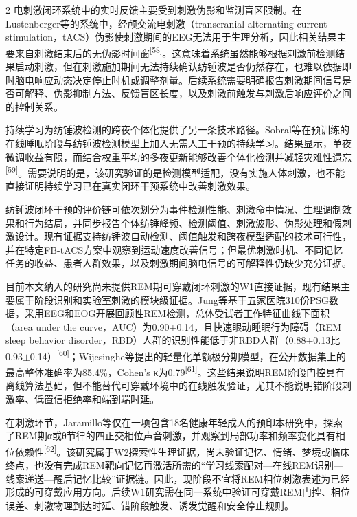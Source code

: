\documentclass[UTF8,zihao=5,fontset=none]{ctexart}
\newcommand{\hei}{\CJKfamily{hei}}
\newcommand{\leveltwo}[1]{%
  \par\noindent{\hei\fontsize{10.5pt}{12.6pt}\selectfont\mdseries #1\par}}
\newcommand{\refcite}[1]{\nolinebreak[4]\textsuperscript{[#1]}}
\begin{document}
\begin{multicols}{2}
电刺激闭环系统中的实时反馈主要受到刺激伪影和监测盲区限制。在Lustenberger等的系统中，经颅交流电刺激（transcranial alternating current stimulation，tACS）伪影使刺激期间的EEG无法用于生理分析，因此相关结果主要来自刺激结束后的无伪影时间窗\refcite{58}。这意味着系统虽然能够根据刺激前检测结果启动刺激，但在刺激施加期间无法持续确认纺锤波是否仍然存在，也难以依据即时脑电响应动态决定停止时机或调整剂量。后续系统需要明确报告刺激期间信号是否可解释、伪影抑制方法、反馈盲区长度，以及刺激前触发与刺激后响应评价之间的控制关系。\par

持续学习为纺锤波检测的跨夜个体化提供了另一条技术路径。Sobral等在预训练的在线睡眠阶段与纺锤波检测模型上加入无需人工干预的持续学习。结果显示，单夜微调收益有限，而结合权重平均的多夜更新能够改善个体化检测并减轻灾难性遗忘\refcite{59}。需要说明的是，该研究验证的是检测模型适配，没有实施人体刺激，也不能直接证明持续学习已在真实闭环干预系统中改善刺激效果。\par

纺锤波闭环干预的评价链可依次划分为事件检测性能、刺激命中情况、生理调制效果和行为结局，并同步报告个体纺锤峰频、检测阈值、刺激波形、伪影处理和假刺激设计。现有证据支持纺锤波自动检测、阈值触发和跨夜模型适配的技术可行性，并在特定FB-tACS方案中观察到运动速度改善信号；但最优刺激时机、不同记忆任务的收益、患者人群效果，以及刺激期间脑电信号的可解释性仍缺少充分证据。\par

\leveltwo{4.3 REM检测与相位刺激：证据与可穿戴缺口}

目前本文纳入的研究尚未提供REM期可穿戴闭环刺激的W1直接证据，现有结果主要属于阶段识别和实验室刺激的模块级证据。Jung等基于五家医院310份PSG数据，采用EEG和EOG开展回顾性REM检测，总体受试者工作特征曲线下面积（area under the curve，AUC）为0.90$\pm$0.14，且快速眼动睡眠行为障碍（REM sleep behavior disorder，RBD）人群的识别性能低于非RBD人群（0.88$\pm$0.13比0.93$\pm$0.14）\refcite{60}；Wijesinghe等提出的轻量化单额极分期模型，在公开数据集上的最高整体准确率为85.4\%，Cohen's κ为0.79\refcite{61}。这些结果说明REM阶段门控具有离线算法基础，但不能替代可穿戴环境中的在线触发验证，尤其不能说明错阶段刺激率、低置信拒绝率和端到端时延。\par

在刺激环节，Jaramillo等仅在一项包含18名健康年轻成人的预印本研究中，探索了REM期α或θ节律的四正交相位声音刺激，并观察到局部功率和频率变化具有相位依赖性\refcite{62}。该研究属于W2探索性生理证据，尚未验证记忆、情绪、梦境或临床终点，也没有完成REM靶向记忆再激活所需的“学习线索配对—在线REM识别—线索递送—醒后记忆比较”证据链。因此，现阶段不宜将REM相位刺激表述为已经形成的可穿戴应用方向。后续W1研究需在同一系统中验证可穿戴REM门控、相位误差、刺激物理到达时延、错阶段触发、诱发觉醒和安全停止规则。\par


\end{multicols}
\end{document}
